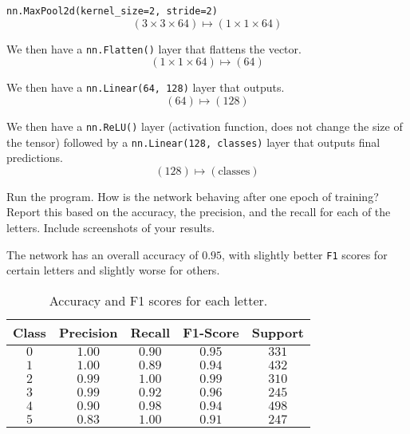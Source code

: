 \begin{problem}
\begin{answer}
\begin{enumarabic}
\begin{enumroman}
          \item \verb|nn.MaxPool2d(kernel_size=2, stride=2)|
            \[ (3 \times 3 \times 64) \mapsto (1 \times 1 \times 64) \]
        \end{enumroman}
      \item We then have a \verb|nn.Flatten()| layer that flattens the vector.
        \[ (1 \times 1 \times 64) \mapsto (64) \]
      \item We then have a \verb|nn.Linear(64, 128)| layer that outputs.
        \[ (64) \mapsto (128) \]
      \item We then have a \verb|nn.ReLU()| layer (activation function,
      does not change the size of the tensor) followed by a \verb|nn.Linear(128, classes)|
      layer that outputs final predictions.
        \[ (128) \mapsto (\text{classes}) \]
    \end{enumarabic}
  \end{answer}
\end{problem}

\newpage
\begin{problem}
  Run the program.
  How is the network behaving after one epoch of training?
  Report this based on the accuracy, the precision, and the recall for each of the letters.
  Include screenshots of your results.
\end{problem}

\begin{answer}
  The network has an overall accuracy of $0.95$, with slightly better \verb|F1| scores
  for certain letters and slightly worse for others.

  
  
\end{answer}
\begin{table}[H]
  \centering
  \begin{tabular}{|c|c|c|c|c|}
  \midrule
  \textbf{Class} & \textbf{Precision} & \textbf{Recall} & \textbf{F1-Score} & \textbf{Support} \\
  \midrule
  $0$              & $1.00$             & $0.90$          & $0.95$            & $331$           \\
  \midrule
  $1$              & $1.00$             & $0.89$          & $0.94$            & $432$           \\
  \midrule
  $2$              & $0.99$             & $1.00$          & $0.99$            & $310$           \\
  \midrule
  $3$              & $0.99$             & $0.92$          & $0.96$            & $245$           \\
  \midrule
  $4$              & $0.90$             & $0.98$          & $0.94$            & $498$           \\
  \midrule
  $5$              & $0.83$             & $1.00$          & $0.91$            & $247$           \\
  \midrule
  \end{tabular}
  \caption{Accuracy and F1 scores for each letter.}
  \label{tab:accuracy-f1}
\end{table}

